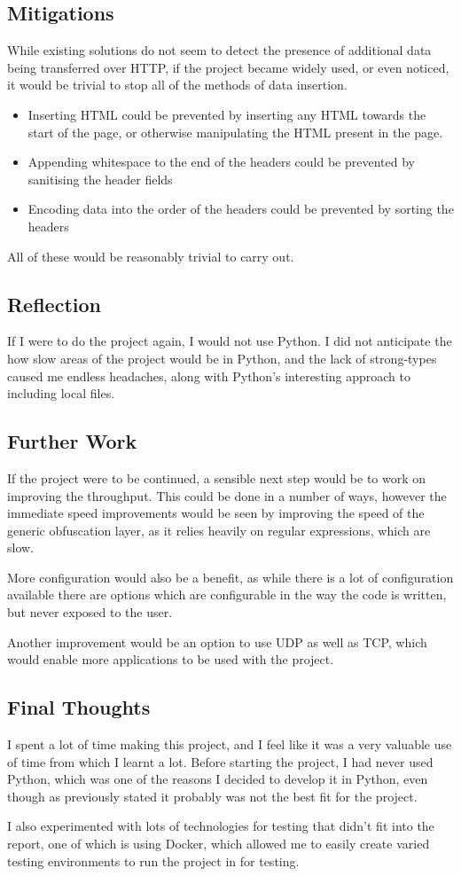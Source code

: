 \subsection{Mitigations}
While existing solutions do not seem to detect the presence of additional data being transferred over HTTP, if the project became widely used, or even noticed, it would be trivial to stop all of the methods of data insertion.\par
\begin{itemize}
    \item Inserting HTML could be prevented by inserting any HTML towards the start of the page, or otherwise manipulating the HTML present in the page.
    \item Appending whitespace to the end of the headers could be prevented by sanitising the header fields
    \item Encoding data into the order of the headers could be prevented by sorting the headers
\end{itemize}
All of these would be reasonably trivial to carry out.

\subsection{Reflection}
If I were to do the project again, I would not use Python. I did not anticipate the how slow areas of the project would be in Python, and the lack of strong-types caused me endless headaches, along with Python's interesting approach to including local files.
\subsection{Further Work}
If the project were to be continued, a sensible next step would be to work on improving the throughput. This could be done in a number of ways, however the immediate speed improvements would be seen by improving the speed of the generic obfuscation layer, as it relies heavily on regular expressions, which are slow.\par
More configuration would also be a benefit, as while there is a lot of configuration available there are options which are configurable in the way the code is written, but never exposed to the user.\par
Another improvement would be an option to use UDP as well as TCP, which would enable more applications to be used with the project.
\subsection{Final Thoughts}
I spent a lot of time making this project, and I feel like it was a very valuable use of time from which I learnt a lot. Before starting the project, I had never used Python, which was one of the reasons I decided to develop it in Python, even though as previously stated it probably was not the best fit for the project.\par
I also experimented with lots of technologies for testing that didn't fit into the report, one of which is using Docker, which allowed me to easily create varied testing environments to run the project in for testing.
